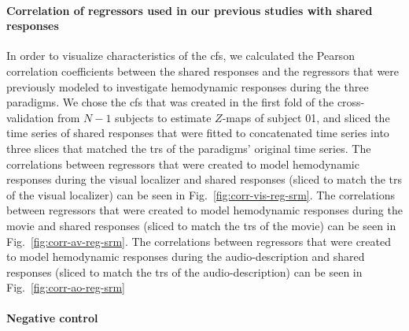 \paragraph{Correlation of regressors used in our previous studies with shared
responses}








In order to visualize characteristics of the \ac{cfs}, we calculated the Pearson
correlation coefficients between the shared responses and the regressors that
were previously modeled \citep{sengupta2016extension, haeusler2022processing} to
investigate hemodynamic responses during the three paradigms.
%
We chose the \ac{cfs} that was created in the first fold of the cross-
validation from $N-1$ subjects to estimate $Z$-maps of subject 01, and sliced
the time series of shared responses that were fitted to concatenated time series
into three slices that matched the \acp{tr} of the paradigms' original time
series.
%
The correlations between regressors that were created to model hemodynamic
responses during the visual localizer and shared responses (sliced to match the
\acp{tr} of the visual localizer) can be seen in
Fig.~\ref{fig:corr-vis-reg-srm}.
%
The correlations between regressors that were created to model hemodynamic
responses during the movie \citep[cf. Table 3 in][]{haeusler2022processing} and
shared responses (sliced to match the \acp{tr} of the movie) can be seen in
Fig.~\ref{fig:corr-av-reg-srm}.
%
The correlations between regressors that were created to model hemodynamic
responses during the audio-description \citep[cf. Table 3
in][]{haeusler2022processing} and shared responses (sliced to match the \acp{tr}
of the audio-description) can be seen in Fig.~\ref{fig:corr-ao-reg-srm}


\paragraph{Negative control}



